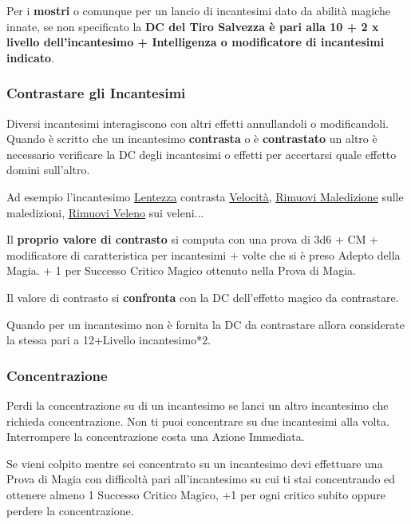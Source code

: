\begin{multicols}{2}
Per i \textbf{mostri} o comunque per un lancio di incantesimi dato da abilità magiche innate, se non specificato la \textbf{DC del Tiro Salvezza è pari alla 10 + 2 x livello dell'incantesimo + Intelligenza o modificatore di incantesimi indicato}.\label{tirosalvezzainccmostro}

\subsubsection{Contrastare gli Incantesimi}\label{contrastareincantesimi}\hypertarget{contrastareincantesimi}{}

Diversi incantesimi interagiscono con altri effetti annullandoli o modificandoli. Quando è scritto che un incantesimo \textbf{contrasta} o è \textbf{contrastato} un altro è necessario verificare la DC degli incantesimi o effetti per accertarsi quale effetto domini sull'altro.

Ad esempio l'incantesimo \hyperlink{Lentezza}{Lentezza} contrasta \hyperlink{Velocità}{Velocità}, \hyperlink{Rimuovi Maledizione}{Rimuovi Maledizione} sulle maledizioni, \hyperlink{Rimuovi Veleno}{Rimuovi Veleno} sui veleni...

Il \textbf{proprio valore di contrasto} si computa con una prova di 3d6 + CM + modificatore di caratteristica per incantesimi + volte che si è preso Adepto della Magia. + 1 per Successo Critico Magico ottenuto nella Prova di Magia.

Il valore di contrasto si \textbf{confronta} con la DC dell'effetto magico da contrastare.

Quando per un incantesimo non è fornita la DC da contrastare allora considerate la stessa pari a 12+Livello incantesimo*2.

\subsubsection{Concentrazione}\label{magieconcentrazione}\hypertarget{magieconcentrazione}{}

Perdi la concentrazione su di un incantesimo se lanci un altro incantesimo che richieda concentrazione. Non ti puoi concentrare su due incantesimi alla volta. Interrompere la concentrazione costa una Azione Immediata.

Se vieni colpito mentre sei concentrato su un incantesimo devi effettuare una Prova di Magia con difficoltà pari all'incantesimo su cui ti stai concentrando ed ottenere almeno 1 Successo Critico Magico, +1 per ogni critico subito oppure perdere la concentrazione.


\end{multicols}
